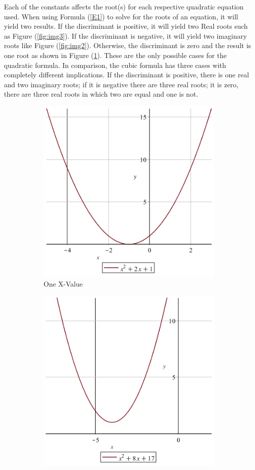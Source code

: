 \documentclass[14pt]{extarticle}
\begin{document}
\indent Each of the constants affects the root(s) for each respective quadratic equation used. When using Formula (\ref{E1}) to solve for the roots of an equation, it will yield two results. If the discriminant is positive, it will yield two Real roots such as Figure (\ref{fig:img3}). If the discriminant is negative, it will yield two imaginary roots like Figure (\ref{fig:img2}). Otherwise, the discriminant is zero and the result is one root as shown in Figure (\ref{fig:img1}). These are the only possible cases for the quadratic formula. In comparison, the cubic formula has three cases with completely different implications. If the discriminant is positive, there is one real and two imaginary roots; if it is negative there are three real roots; it is zero, there are three real roots in which two are equal and one is not.
\footnotesize
\begin{figure}[h]
\caption{Curve Examples}
\begin{subfigure}{0.33\textwidth}
\includegraphics[width=0.8\linewidth]{graph1.png}
\caption{One X-Value}
\label{fig:img1}
\end{subfigure}
\begin{subfigure}{0.33\textwidth}
\includegraphics[width=0.8\linewidth]{graph2.png}

\end{subfigure}
\end{figure}
\end{document}
